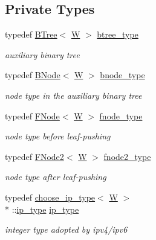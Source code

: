 \subsection*{Private Types}
\begin{DoxyCompactItemize}
\item 
typedef \hyperlink{classBTree}{B\-Tree}$<$ \hyperlink{test__u128_8cpp_ab21b528bc38899d04d3a7053e52fb797}{W} $>$ \hyperlink{classFSTree_a33535253397298880117e194d531f9f6}{btree\-\_\-type}
\begin{DoxyCompactList}\small\item\em auxiliary binary tree \end{DoxyCompactList}\item 
typedef \hyperlink{structBNode}{B\-Node}$<$ \hyperlink{test__u128_8cpp_ab21b528bc38899d04d3a7053e52fb797}{W} $>$ \hyperlink{classFSTree_a8de11a7133f6140a2bafb93b78a06321}{bnode\-\_\-type}
\begin{DoxyCompactList}\small\item\em node type in the auxiliary binary tree \end{DoxyCompactList}\item 
typedef \hyperlink{structFNode}{F\-Node}$<$ \hyperlink{test__u128_8cpp_ab21b528bc38899d04d3a7053e52fb797}{W} $>$ \hyperlink{classFSTree_a67d384ab5a196299d83dde842299fe7f}{fnode\-\_\-type}
\begin{DoxyCompactList}\small\item\em node type before leaf-\/pushing \end{DoxyCompactList}\item 
typedef \hyperlink{structFNode2}{F\-Node2}$<$ \hyperlink{test__u128_8cpp_ab21b528bc38899d04d3a7053e52fb797}{W} $>$ \hyperlink{classFSTree_ae109ec54da0c7eb682ab08c8f8bc615c}{fnode2\-\_\-type}
\begin{DoxyCompactList}\small\item\em node type after leaf-\/pushing \end{DoxyCompactList}\item 
typedef \hyperlink{types_8h_structchoose__ip__type}{choose\-\_\-ip\-\_\-type}$<$ \hyperlink{test__u128_8cpp_ab21b528bc38899d04d3a7053e52fb797}{W} $>$\\*
\-::\hyperlink{classFSTree_a4766ee89821315425e2c6090bd0a0245}{ip\-\_\-type} \hyperlink{classFSTree_a4766ee89821315425e2c6090bd0a0245}{ip\-\_\-type}
\begin{DoxyCompactList}\small\item\em integer type adopted by ipv4/ipv6 \end{DoxyCompactList}\end{DoxyCompactItemize}
